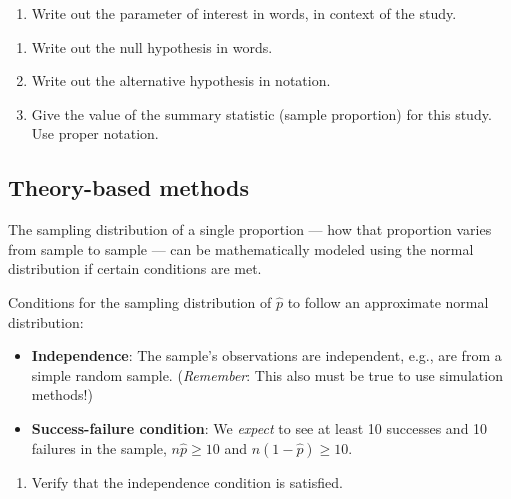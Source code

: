 \documentclass[
]{report}
\providecommand{\tightlist}{%
  \setlength{\itemsep}{0pt}\setlength{\parskip}{0pt}}
\begin{document}
\begin{enumerate}
\def\labelenumi{\arabic{enumi}.}
\tightlist
\item
  Write out the parameter of interest in words, in context of the study.
\end{enumerate}

\vspace{0.8in}

\begin{enumerate}
\def\labelenumi{\arabic{enumi}.}
\setcounter{enumi}{1}
\item
  Write out the null hypothesis in words.
  \vspace{0.8in}
\item
  Write out the alternative hypothesis in notation.
  \vspace{0.3in}
\item
  Give the value of the summary statistic (sample proportion) for this study. Use proper notation.
\end{enumerate}

\vspace{0.3in}

\hypertarget{theory-based-methods-1}{%
\subsection*{Theory-based methods}\label{theory-based-methods-1}}

The sampling distribution of a single proportion --- how that proportion varies from sample to sample --- can be mathematically modeled using the normal distribution if certain conditions are met.

Conditions for the sampling distribution of \(\hat{p}\) to follow an approximate normal distribution:

\begin{itemize}
\item
  \textbf{Independence}: The sample's observations are independent, e.g., are from a simple random sample. (\emph{Remember}: This also must be true to use simulation methods!)
\item
  \textbf{Success-failure condition}: We \emph{expect} to see at least 10 successes and 10 failures in the sample, \(n\hat{p}≥10\) and \(n(1-\hat{p})≥10\).
\end{itemize}

\begin{enumerate}
\def\labelenumi{\arabic{enumi}.}
\setcounter{enumi}{4}
\tightlist
\item
  Verify that the independence condition is satisfied.
\end{enumerate}
\end{document}
